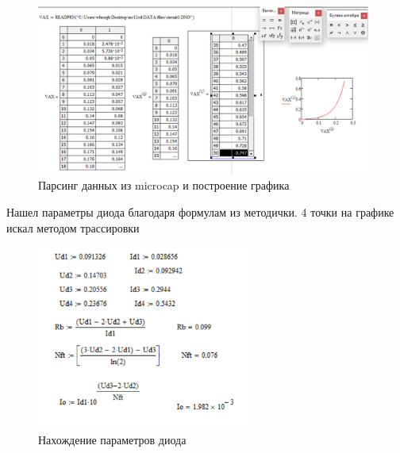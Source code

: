 \begin{figure}[H]
	\centering
	\includegraphics[width=0.98\textwidth]{img/01_mathcad.jpg}
	\captionsetup{font=footnotesize}
	\caption{Парсинг данных из microcap и построение графика}
	\label{fig:01_mathcad}
\end{figure}

\noindent Нашел параметры диода благодаря формулам из методички. 4 точки на графике искал методом трассировки 
\begin{figure}[H]
	\centering
	\includegraphics[width=0.63\textwidth]{img/02_mathcad.jpg}
	\captionsetup{font=footnotesize}
	\caption{Нахождение параметров диода}
	\label{fig:02_mathcad}
\end{figure}

